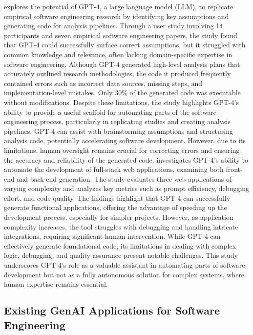 \citet{liang2024can} explores the potential of GPT-4, a large language model (LLM), to replicate empirical software engineering research by identifying key assumptions and generating code for analysis pipelines. Through a user study involving 14 participants and seven empirical software engineering papers, the study found that GPT-4 could successfully surface correct assumptions, but it struggled with common knowledge and relevance, often lacking domain-specific expertise in software engineering. Although GPT-4 generated high-level analysis plans that accurately outlined research methodologies, the code it produced frequently contained errors such as incorrect data sources, missing steps, and implementation-level mistakes. Only 30\% of the generated code was executable without modifications. Despite these limitations, the study highlights GPT-4’s ability to provide a useful scaffold for automating parts of the software engineering process, particularly in replicating studies and creating analysis pipelines. GPT-4 can assist with brainstorming assumptions and structuring analysis code, potentially accelerating software development. However, due to its limitations, human oversight remains crucial for correcting errors and ensuring the accuracy and reliability of the generated code.
\citep{sandberg2024evaluating} investigates GPT-4’s ability to automate the development of full-stack web applications, examining both front-end and back-end generation. The study evaluates three web applications of varying complexity and analyzes key metrics such as prompt efficiency, debugging effort, and code quality. The findings highlight that GPT-4 can successfully generate functional applications, offering the advantage of speeding up the development process, especially for simpler projects. However, as application complexity increases, the tool struggles with debugging and handling intricate integrations, requiring significant human intervention. While GPT-4 can effectively generate foundational code, its limitations in dealing with complex logic, debugging, and quality assurance present notable challenges. This study underscores GPT-4’s role as a valuable assistant in automating parts of software development but not as a fully autonomous solution for complex systems, where human expertise remains essential.

\subsection{Existing GenAI Applications for Software Engineering}


